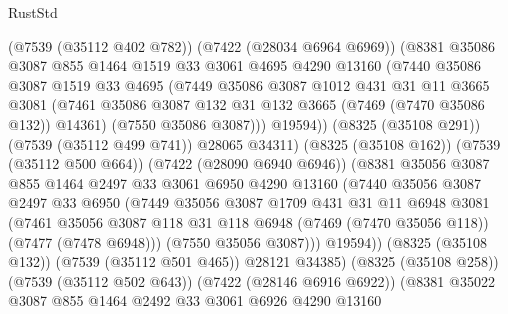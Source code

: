 \begin{lexlean}{RustStd}
\begin{coremodule}
                  (@7539 (@35112 @402 @782))
                  (@7422 (@28034 @6964 @6969))
                  (@8381
                    @35086
                    @3087
                    @855
                    @1464
                    @1519
                    @33
                    @3061
                    @4695
                    @4290
                    @13160
                    (@7440
                      @35086
                      @3087
                      @1519
                      @33
                      @4695
                      (@7449
                        @35086
                        @3087
                        @1012
                        @431
                        @31
                        @11
                        @3665
                        @3081
                        (@7461 @35086 @3087 @132 @31 @132 @3665 (@7469 (@7470 @35086 @132)) @14361)
                        (@7550 @35086 @3087)))
                    @19594))
                (@8325 (@35108 @291))
                (@7539 (@35112 @499 @741))
                @28065
                @34311)
              (@8325 (@35108 @162))
              (@7539 (@35112 @500 @664))
              (@7422 (@28090 @6940 @6946))
              (@8381
                @35056
                @3087
                @855
                @1464
                @2497
                @33
                @3061
                @6950
                @4290
                @13160
                (@7440
                  @35056
                  @3087
                  @2497
                  @33
                  @6950
                  (@7449
                    @35056
                    @3087
                    @1709
                    @431
                    @31
                    @11
                    @6948
                    @3081
                    (@7461
                      @35056
                      @3087
                      @118
                      @31
                      @118
                      @6948
                      (@7469 (@7470 @35056 @118))
                      (@7477 (@7478 @6948)))
                    (@7550 @35056 @3087)))
                @19594))
            (@8325 (@35108 @132))
            (@7539 (@35112 @501 @465))
            @28121
            @34385)
          (@8325 (@35108 @258))
          (@7539 (@35112 @502 @643))
          (@7422 (@28146 @6916 @6922))
          (@8381
            @35022
            @3087
            @855
            @1464
            @2492
            @33
            @3061
            @6926
            @4290
            @13160

\end{coremodule}
\end{lexlean}
